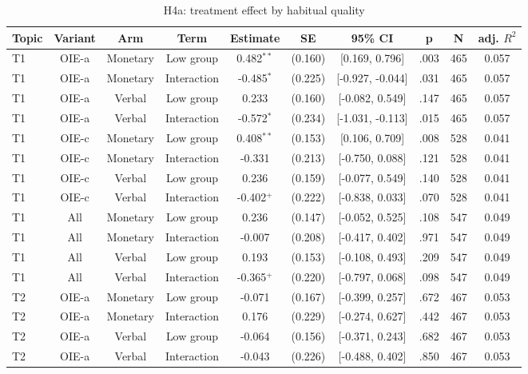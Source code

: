 \begin{table}[htbp]
\centering
\begin{threeparttable}
\caption{H4a: treatment effect by habitual quality}
\label{tab:tab_h4a_treatment_moderation}
\begin{tabular}{lccccccccc}
\toprule
  Topic & Variant & Arm & Term & Estimate & SE & 95\% CI & p & N & adj. $R^2$ \\
\midrule
  T1 & OIE-a & Monetary & Low group & 0.482$^{**}$ & (0.160) & [0.169, 0.796] & .003 & 465 & 0.057 \\
  T1 & OIE-a & Monetary & Interaction & -0.485$^{*}$ & (0.225) & [-0.927, -0.044] & .031 & 465 & 0.057 \\
  T1 & OIE-a & Verbal & Low group & 0.233 & (0.160) & [-0.082, 0.549] & .147 & 465 & 0.057 \\
  T1 & OIE-a & Verbal & Interaction & -0.572$^{*}$ & (0.234) & [-1.031, -0.113] & .015 & 465 & 0.057 \\
  T1 & OIE-c & Monetary & Low group & 0.408$^{**}$ & (0.153) & [0.106, 0.709] & .008 & 528 & 0.041 \\
  T1 & OIE-c & Monetary & Interaction & -0.331 & (0.213) & [-0.750, 0.088] & .121 & 528 & 0.041 \\
  T1 & OIE-c & Verbal & Low group & 0.236 & (0.159) & [-0.077, 0.549] & .140 & 528 & 0.041 \\
  T1 & OIE-c & Verbal & Interaction & -0.402$^{+}$ & (0.222) & [-0.838, 0.033] & .070 & 528 & 0.041 \\
  T1 & All & Monetary & Low group & 0.236 & (0.147) & [-0.052, 0.525] & .108 & 547 & 0.049 \\
  T1 & All & Monetary & Interaction & -0.007 & (0.208) & [-0.417, 0.402] & .971 & 547 & 0.049 \\
  T1 & All & Verbal & Low group & 0.193 & (0.153) & [-0.108, 0.493] & .209 & 547 & 0.049 \\
  T1 & All & Verbal & Interaction & -0.365$^{+}$ & (0.220) & [-0.797, 0.068] & .098 & 547 & 0.049 \\
  T2 & OIE-a & Monetary & Low group & -0.071 & (0.167) & [-0.399, 0.257] & .672 & 467 & 0.053 \\
  T2 & OIE-a & Monetary & Interaction & 0.176 & (0.229) & [-0.274, 0.627] & .442 & 467 & 0.053 \\
  T2 & OIE-a & Verbal & Low group & -0.064 & (0.156) & [-0.371, 0.243] & .682 & 467 & 0.053 \\
  T2 & OIE-a & Verbal & Interaction & -0.043 & (0.226) & [-0.488, 0.402] & .850 & 467 & 0.053 \\

\end{tabular}
\end{threeparttable}
\end{table}
